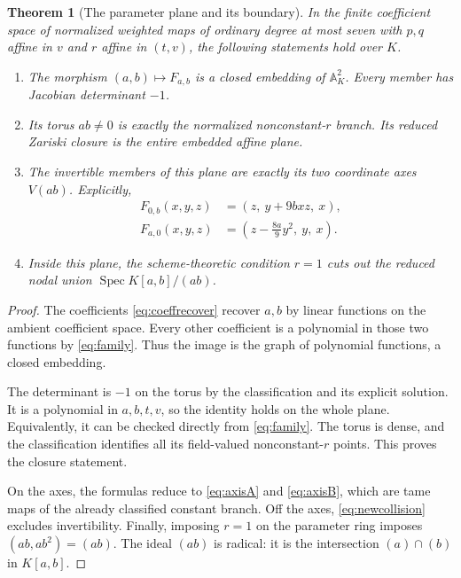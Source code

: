 \documentclass[11pt,a4paper]{article}
\numberwithin{equation}{section}
\newtheorem{theorem}{Theorem}[section]
\theoremstyle{definition}
\theoremstyle{remark}
\newcommand{\A}{\mathbb{A}}
\newcommand{\Spec}{\operatorname{Spec}}
\begin{document}
\begin{theorem}[The parameter plane and its boundary]\label{thm:plane}
In the finite coefficient space of normalized weighted maps of ordinary
degree at most seven with $p,q$ affine in $v$ and $r$ affine in $(t,v)$,
the following statements hold over $K$.
\begin{enumerate}[label=\textup{(\roman*)}]
\item The morphism $(a,b)\mapsto F_{a,b}$ is a closed embedding of
$\A^2_K$. Every member has Jacobian determinant $-1$.
\item Its torus $ab\ne0$ is exactly the normalized nonconstant-$r$ branch.
Its reduced Zariski closure is the entire embedded affine plane.
\item The invertible members of this plane are exactly its two coordinate
axes $V(ab)$. Explicitly,
\begin{align}
F_{0,b}(x,y,z)&=(z,\ y+9bxz,\ x),\label{eq:axisA}\\
F_{a,0}(x,y,z)&=\left(z-\frac{8a}{9}y^2,\ y,\ x\right).
\label{eq:axisB}
\end{align}
\item Inside this plane, the scheme-theoretic condition $r=1$ cuts out the
reduced nodal union $\Spec K[a,b]/(ab)$.
\end{enumerate}
\end{theorem}
\begin{proof}
The coefficients \eqref{eq:coeffrecover} recover $a,b$ by linear functions
on the ambient coefficient space. Every other coefficient is a polynomial
in those two functions by \eqref{eq:family}. Thus the image is the graph of
polynomial functions, a closed embedding.

The determinant is $-1$ on the torus by the classification and its explicit
solution. It is a polynomial in $a,b,t,v$, so the identity holds on the
whole plane. Equivalently, it can be checked directly from
\eqref{eq:family}. The torus is dense, and the classification identifies all
its field-valued nonconstant-$r$ points. This proves the closure statement.

On the axes, the formulas reduce to \eqref{eq:axisA} and \eqref{eq:axisB},
which are tame maps of the already classified constant branch. Off the
axes, \eqref{eq:newcollision} excludes invertibility. Finally, imposing
$r=1$ on the parameter ring imposes $(ab,ab^2)=(ab)$. The ideal $(ab)$ is
radical: it is the intersection $(a)\cap(b)$ in $K[a,b]$.
\end{proof}
\end{document}
